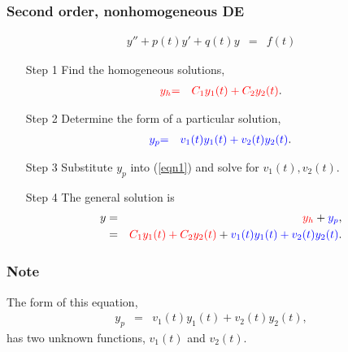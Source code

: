 \begin{frame}
  \frametitle{Second order, nonhomogeneous DE}
  \vspace{-1cm}
  \begin{eqnarray}\label{eqn1}
    y'' + p(t) y' + q(t) y & = & f(t)
  \end{eqnarray}
  \begin{itemize}
  \item[Step 1] Find the homogeneous solutions,
    \begin{eqnarray*}
      {\color{red}y_h} & {\color{red}=} & {\color{red}C_1 y_1(t) + C_2 y_2(t)}.
    \end{eqnarray*}
  \item[Step 2] Determine the form of a particular solution,
    \begin{eqnarray*}
      {\color{blue}y_p} & {\color{blue}=} & {\color{blue}v_1(t) y_1(t) + v_2(t) y_2(t)}.
    \end{eqnarray*}
  \item[Step 3] Substitute $y_p$ into (\ref{eqn1}) and solve  for $v_1(t), v_2(t)$.
  \item[Step 4] The general solution is 
    \begin{eqnarray*}
      y & = & {\color{red}y_h}+{\color{blue}y_p}, \\
        & = & {\color{red}C_1 y_1(t) + C_2 y_2(t)} + {\color{blue}v_1(t) y_1(t) + v_2(t) y_2(t)}.
    \end{eqnarray*}

  \end{itemize}

\end{frame}


\begin{frame}
  \frametitle{Note}

  The form of this equation,
  \begin{eqnarray*}
    y_p & = & v_1(t) y_1(t) + v_2(t) y_2(t),
  \end{eqnarray*}
  has two unknown functions, $v_1(t)$ and $v_2(t)$.
  
  \vfill


  \vfill


  \vfill

\end{frame}


